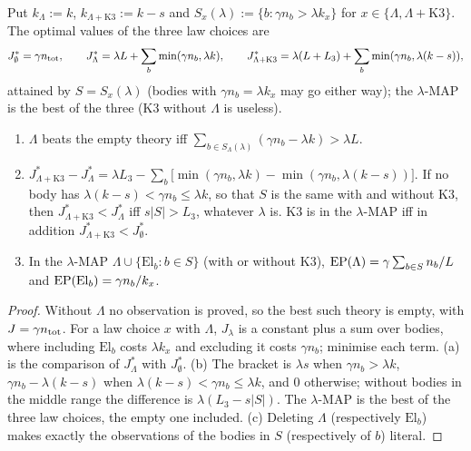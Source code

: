 \begin{proposition}\label{prop:laws:K3}
Put $k_\Lambda:=k$, $k_{\Lambda+\mathrm{K3}}:=k-s$ and $S_x(\lambda):=\{b:\gamma n_b>\lambda k_x\}$ for $x\in\{\Lambda,\Lambda+\mathrm{K3}\}$. The optimal values of the three law choices are
\[J^*_\emptyset=\gamma n_{\rm tot},\qquad J^*_\Lambda=\lambda L+\sum_b\min(\gamma n_b,\lambda k),\qquad J^*_{\Lambda+\mathrm{K3}}=\lambda(L+L_3)+\sum_b\min(\gamma n_b,\lambda(k-s)),\]
attained by $S=S_x(\lambda)$ (bodies with $\gamma n_b=\lambda k_x$ may go either way); the $\lambda$-MAP is the best of the three ($\mathrm{K3}$ without $\Lambda$ is useless).
\begin{enumerate}[label=(\alph*),itemsep=1pt,topsep=2pt]
\item $\Lambda$ beats the empty theory iff $\sum_{b\in S_\Lambda(\lambda)}(\gamma n_b-\lambda k)>\lambda L$.
\item $J^*_{\Lambda+\mathrm{K3}}-J^*_\Lambda=\lambda L_3-\sum_b\big[\min(\gamma n_b,\lambda k)-\min(\gamma n_b,\lambda(k-s))\big]$. If no body has $\lambda(k-s)<\gamma n_b\le\lambda k$, so that $S$ is the same with and without $\mathrm{K3}$, then $J^*_{\Lambda+\mathrm{K3}}<J^*_\Lambda$ iff $s\lvert S\rvert>L_3$, whatever $\lambda$ is. $\mathrm{K3}$ is in the $\lambda$-MAP iff in addition $J^*_{\Lambda+\mathrm{K3}}<J^*_\emptyset$.
\item In the $\lambda$-MAP $\Lambda\cup\{\mathrm{El}_b:b\in S\}$ (with or without $\mathrm{K3}$), $\mathrm{EP}(\Lambda)=\gamma\sum_{b\in S}n_b/L$ and $\mathrm{EP}(\mathrm{El}_b)=\gamma n_b/k_x$.
\end{enumerate}
\end{proposition}

\begin{proof}
Without $\Lambda$ no observation is proved, so the best such theory is empty, with $J=\gamma n_{\rm tot}$. For a law choice $x$ with $\Lambda$, $J_\lambda$ is a constant plus a sum over bodies, where including $\mathrm{El}_b$ costs $\lambda k_x$ and excluding it costs $\gamma n_b$; minimise each term. (a) is the comparison of $J^*_\Lambda$ with $J^*_\emptyset$. (b) The bracket is $\lambda s$ when $\gamma n_b>\lambda k$, $\gamma n_b-\lambda(k-s)$ when $\lambda(k-s)<\gamma n_b\le\lambda k$, and $0$ otherwise; without bodies in the middle range the difference is $\lambda(L_3-s\lvert S\rvert)$. The $\lambda$-MAP is the best of the three law choices, the empty one included. (c) Deleting $\Lambda$ (respectively $\mathrm{El}_b$) makes exactly the observations of the bodies in $S$ (respectively of $b$) literal.
\end{proof}


